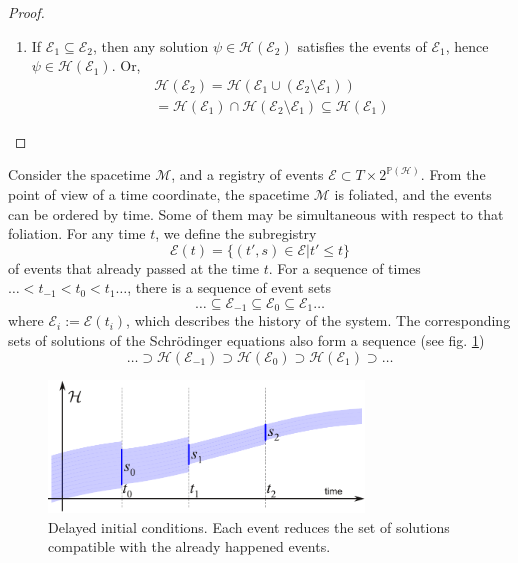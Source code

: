 \documentclass[12pt]{amsart}
\theoremstyle{definition}
\theoremstyle{plain}
\begin{document}
\begin{proof}
\begin{enumerate}
	\item 
If $\mathcal E_1\subseteq \mathcal E_2$, then any solution $\psi\in\mathscr{H}(\mathcal E_2)$ satisfies the events of $\mathcal E_1$, hence $\psi\in\mathscr{H}(\mathcal E_1)$.
Or,
\begin{equation}
\begin{array}{l}
\mathscr{H}(\mathcal E_2) = \mathscr{H}\left(\mathcal E_1\cup (\mathcal E_2\setminus \mathcal E_1)\right) \\
= \mathscr{H}(\mathcal E_1)\cap \mathscr{H}\left(\mathcal E_2\setminus \mathcal E_1\right) \subseteq \mathscr{H}(\mathcal E_1)
\end{array}
\end{equation}
\end{enumerate}
\end{proof}

Consider the spacetime $\mathcal M$, and a registry of events $\mathcal E\subset T\times 2^{\mathbb P(\mathcal{H})}$. From the point of view of a time coordinate, the spacetime $\mathcal M$ is foliated, and the events can be ordered by time. Some of them may be simultaneous with respect to that foliation. For any time $t$, we define the subregistry
\begin{equation}
\mathcal E(t)=\{(t',s)\in\mathcal E|t'\leq t\}
\end{equation}
of events that already passed at the time $t$. For a sequence of times $\ldots < t_{-1} < t_0 < t_1 \ldots$, there is a sequence of event sets
\begin{equation}
\ldots \subseteq \mathcal E_{-1} \subseteq \mathcal E_0 \subseteq \mathcal E_1 \ldots
\end{equation}
where $\mathcal E_i:=\mathcal E(t_i)$, which describes the history of the system. The corresponding sets of solutions of the Schr\"odinger equations also form a sequence (see fig. \ref{Fig1})
\begin{equation}
\ldots \supset \mathscr{H}(\mathcal E_{-1}) \supset \mathscr{H}(\mathcal E_0) \supset \mathscr{H}(\mathcal E_1) \supset \ldots
\end{equation}

\begin{figure}[t!]
\centering
\includegraphics[width=84mm]{Fig1}
\caption{\label{Fig1}Delayed initial conditions. Each event reduces the set of solutions compatible with the already happened events.}
\end{figure}
\end{document}
